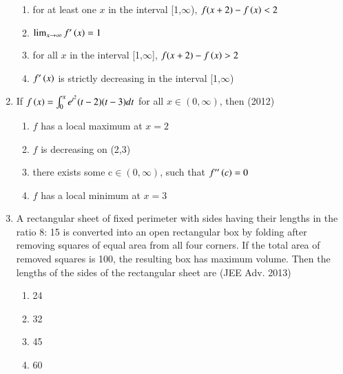 \documentclass[journal]{IEEEtran}
\begin{document}
\begin{enumerate}
{            \begin{enumerate}
                \item for at least one $x$ in the interval [1,$\infty$), $f(x+2)-f\left(x\right)<2$
                \item $\lim_{x\to\infty} f'\left(x\right) = 1$
                \item for all $x$ in the interval [1,$\infty$], $f(x+2)-f\left(x\right)>2$
                \item $f'\left(x\right)$ is strictly decreasing in the interval [1,$\infty$)
            \end{enumerate}
        
        }
    \item{
        
            If $f\left(x\right)= \int_{0}^x e^{t^2}(t-2)(t-3)dt$ for all $x \in(0,\infty)$, then
             \hfill
                {(2012)}
            
            \begin{enumerate}
                \item $f$ has a local maximum at $x=2$ 
                \item $f$ is decreasing on (2,3)
                \item there exists some c$\in(0,\infty)$, such that $f''\left(c\right)=0$
                \item $f$ has a local minimum at $x=3$
            \end{enumerate}
        
        }
    \item{
    
        
            A rectangular sheet of fixed perimeter with sides having their lengths in the ratio 8: 15 is converted into an open rectangular box by folding after removing squares of equal area from all four corners. If the total area of removed squares is 100, the resulting box has maximum volume. Then the lengths of the sides of the rectangular sheet are
             \hfill
                {(JEE Adv. 2013)}
            \begin{multicols}{2}
                \begin{enumerate}
                    \item 24
                    \item 32
                    \item 45
                    \item 60
                \end{enumerate}
            \end{multicols}

}
\end{enumerate}
\end{document}
